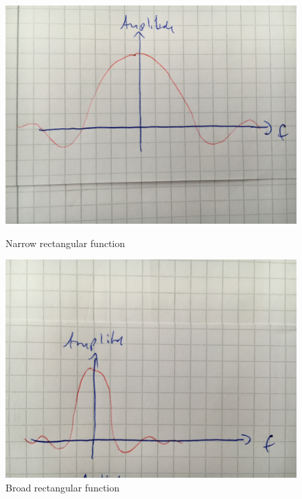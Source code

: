 \documentclass[12pt]{article}
\begin{document}
\begin{figure}[!htbp]
  \centering
  \begin{minipage}[b]{0.45\textwidth}
    \includegraphics[width=\textwidth]{images/rect_narrow}
    \caption{Narrow rectangular function}
  \end{minipage}
  \hfill
  \begin{minipage}[b]{0.45\textwidth}
    \includegraphics[width=\textwidth]{images/rect_broad}
    \caption{Broad rectangular function}
  \end{minipage}
\end{figure}
\end{document}
